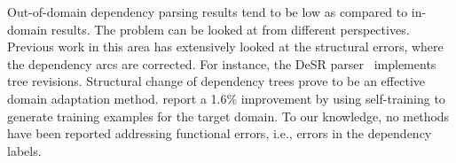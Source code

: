 Out-of-domain dependency parsing results tend to be low as compared to in-domain results. The problem can be looked at from different perspectives. Previous work in this area has extensively looked at the structural errors, where the dependency arcs are corrected. For instance, the DeSR parser~\cite{attardi2007multilingual, attardi2007tree, attardi2009accurate} implements tree revisions. %
Structural change of dependency trees prove to be an effective domain adaptation method. %
\citet{yu2015domain} report a 1.6\% improvement by using self-training to generate training examples for the target domain. To our knowledge, no methods have been reported addressing functional errors, i.e., errors in the dependency labels.

